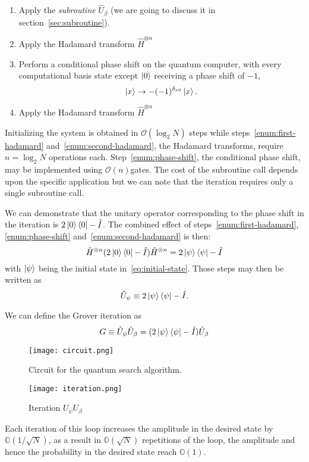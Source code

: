 \begin{enumerate}
  \item Apply the \emph{subroutine} $\hat{U}_\beta$ (we are going to discuss it in section~\ref{sec:subroutine}).
  \item Apply the Hadamard transform $\hat{H}^{\otimes n}$ \label{enum:first-hadamard}
  \item \label{enum:phase-shift} Perform a conditional phase shift on the quantum computer, with every computational basis state except $\ket{0}$ receiving a phase shift of $-1$,
  \begin{equation*}
      \ket{x} \rightarrow -(-1)^{\delta_{x0}} \ket{x}.
  \end{equation*}
  \item Apply the Hadamard transform $\hat{H}^{\otimes n}$ \label{enum:second-hadamard}
\end{enumerate}
Initializing the system is obtained in $\mathcal{O}(\log_2{N})$ steps while steps~\ref{enum:first-hadamard} and~\ref{enum:second-hadamard}, the Hadamard transforms, require $n=\log_2{N}$ operations each. Step~\ref{enum:phase-shift}, the conditional phase shift, may be implemented using $\mathcal{O}(n)$gates. The cost of the subroutine call depends upon the specific application but we can note that the iteration requires only a single subroutine call.


\begin{defn}
We can demonstrate that the unitary operator corresponding to the phase shift in the iteration is $2\ket{0}\bra{0}-\hat{I}$. The combined effect of steps~\ref{enum:first-hadamard},\ref{enum:phase-shift} and~\ref{enum:second-hadamard} is then:
\begin{equation*}
    \hat{H}^{\otimes n} (2\ket{0}\bra{0}-\hat{I}) \hat{H}^{\otimes n} =  2\ket{\psi}\bra{\psi}-\hat{I}
\end{equation*}
with $\ket{\psi}$ being the initial state in~\ref{eq:initial-state}. Those steps may then be written as
\begin{equation*}
    \hat{U}_\psi \equiv 2 \ket{\psi}\bra{\psi} - \hat{I}.
\end{equation*}
\end{defn}
\begin{defn}
We can define the Grover iteration as
\begin{equation}\label{eq:grover-iteration}
G \equiv \hat{U}_\psi\hat{U}_\beta = (2 \ket{\psi}\bra{\psi} - \hat{I}) \hat{U}_\beta
\end{equation}
\end{defn}
\begin{figure}
\texttt{[image: circuit.png]}
\centering
\caption{Circuit for the quantum search algorithm.}
\end{figure}
\begin{figure}
\texttt{[image: iteration.png]}
\centering
\caption{Iteration $U_\psi U_\beta$}
\end{figure}
Each iteration of this loop increases the amplitude in the desired state by $\mathbb{O}(1/\sqrt{N})$, as a result in $\mathbb{O}(\sqrt{N})$ repetitions of the loop, the amplitude and hence the probability in the desired state reach $\mathbb{O}(1)$.

